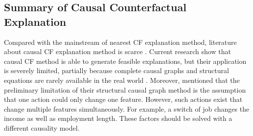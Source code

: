 \subsection{Summary of Causal Counterfactual Explanation}  
Compared with the mainstream of nearest CF explanation method, literature about causal CF explanation method is scarce \cite{algorithmicrecourse}. Current research show that causal CF method is able to generate feasible explanations, but their application is severely limited, partially because complete causal graphs and structural equations are rarely available in the real world \cite{CFReview}. Moreover, \citeauthor{algorithmicrecourse} \cite{algorithmicrecourse} mentioned that the preliminary limitation of their structural causal graph method is the assumption that one action could only change one feature. However, such actions exist that change multiple features simultaneously. For example, a switch of job changes the income as well as employment length. These factors should be solved with a different causality model.    